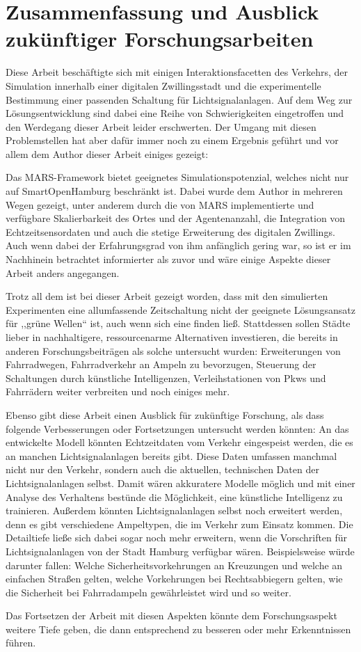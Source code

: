 %


\chapter{Zusammenfassung und Ausblick zukünftiger Forschungsarbeiten}\label{ch:summary}

Diese Arbeit beschäftigte sich mit einigen Interaktionsfacetten des Verkehrs, der Simulation innerhalb einer digitalen Zwillingsstadt und die experimentelle Bestimmung einer passenden Schaltung für Lichtsignalanlagen.
Auf dem Weg zur Lösungsentwicklung sind dabei eine Reihe von Schwierigkeiten eingetroffen und den Werdegang dieser Arbeit leider erschwerten.
Der Umgang mit diesen Problemstellen hat aber dafür immer noch zu einem Ergebnis geführt und vor allem dem Author dieser Arbeit einiges gezeigt:

Das MARS-Framework bietet geeignetes Simulationspotenzial, welches nicht nur auf SmartOpenHamburg beschränkt ist.
Dabei wurde dem Author in mehreren Wegen gezeigt, unter anderem durch die von MARS implementierte und verfügbare Skalierbarkeit des Ortes und der Agentenanzahl, die Integration von Echtzeitsensordaten und auch die stetige Erweiterung des digitalen Zwillings.
Auch wenn dabei der Erfahrungsgrad von ihm anfänglich gering war, so ist er im Nachhinein betrachtet informierter als zuvor und wäre einige Aspekte dieser Arbeit anders angegangen.

Trotz all dem ist bei dieser Arbeit gezeigt worden, dass mit den simulierten Experimenten eine allumfassende Zeitschaltung nicht der geeignete Lösungsansatz für ,,grüne Wellen`` ist, auch wenn sich eine finden ließ.
Stattdessen sollen Städte lieber in nachhaltigere, ressourcenarme Alternativen investieren, die bereits in anderen Forschungsbeiträgen als solche untersucht wurden: Erweiterungen von Fahrradwegen, Fahrradverkehr an Ampeln zu bevorzugen, Steuerung der Schaltungen durch künstliche Intelligenzen, Verleihstationen von Pkws und Fahrrädern weiter verbreiten und noch einiges mehr.

Ebenso gibt diese Arbeit einen Ausblick für zukünftige Forschung, als dass folgende Verbesserungen oder Fortsetzungen untersucht werden könnten:
An das entwickelte Modell könnten Echtzeitdaten vom Verkehr eingespeist werden, die es an manchen Lichtsignalanlagen bereits gibt.
Diese Daten umfassen manchmal nicht nur den Verkehr, sondern auch die aktuellen, technischen Daten der Lichtsignalanlagen selbst.
Damit wären akkuratere Modelle möglich und mit einer Analyse des Verhaltens bestünde die Möglichkeit, eine künstliche Intelligenz zu trainieren.
Außerdem könnten Lichtsignalanlagen selbst noch erweitert werden, denn es gibt verschiedene Ampeltypen, die im Verkehr zum Einsatz kommen.
Die Detailtiefe ließe sich dabei sogar noch mehr erweitern, wenn die Vorschriften für Lichtsignalanlagen von der Stadt Hamburg verfügbar wären.
Beispielsweise würde darunter fallen: Welche Sicherheitsvorkehrungen an Kreuzungen und welche an einfachen Straßen gelten, welche Vorkehrungen bei Rechtsabbiegern gelten, wie die Sicherheit bei Fahrradampeln gewährleistet wird und so weiter.

Das Fortsetzen der Arbeit mit diesen Aspekten könnte dem Forschungsaspekt weitere Tiefe geben, die dann entsprechend zu besseren oder mehr Erkenntnissen führen.
